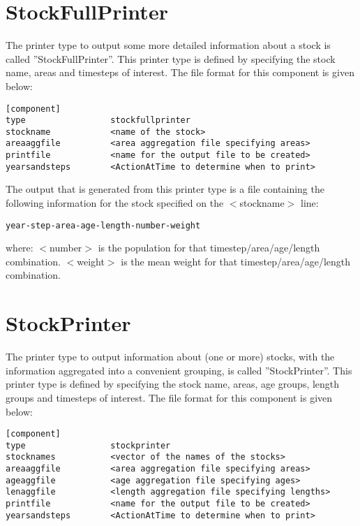 \documentclass [a4paper, 10pt]{book}
\begin{document}
\section{StockFullPrinter}\label{sec:stockfullprinter}
The printer type to output some more detailed information about a stock is called ''StockFullPrinter''.  This printer type is defined by specifying the stock name, areas and timesteps of interest.  The file format for this component is given below:

{\small\begin{verbatim}
[component]
type                 stockfullprinter
stockname            <name of the stock>
areaaggfile          <area aggregation file specifying areas>
printfile            <name for the output file to be created>
yearsandsteps        <ActionAtTime to determine when to print>
\end{verbatim}}

The output that is generated from this printer type is a file containing the following information for the stock specified on the $<$stockname$>$ line:

{\small\begin{verbatim}
year-step-area-age-length-number-weight
\end{verbatim}}

where:\newline
$<$number$>$ is the population for that timestep/area/age/length combination.\newline
$<$weight$>$ is the mean weight for that timestep/area/age/length combination.

\section{StockPrinter}\label{sec:stockprinter}
The printer type to output information about (one or more) stocks, with the information aggregated into a convenient grouping, is called ''StockPrinter''.  This printer type is defined by specifying the stock name, areas, age groups, length groups and timesteps of interest.  The file format for this component is given below:

{\small\begin{verbatim}
[component]
type                 stockprinter
stocknames           <vector of the names of the stocks>
areaaggfile          <area aggregation file specifying areas>
ageaggfile           <age aggregation file specifying ages>
lenaggfile           <length aggregation file specifying lengths>
printfile            <name for the output file to be created>
yearsandsteps        <ActionAtTime to determine when to print>
\end{verbatim}}
\end{document}
